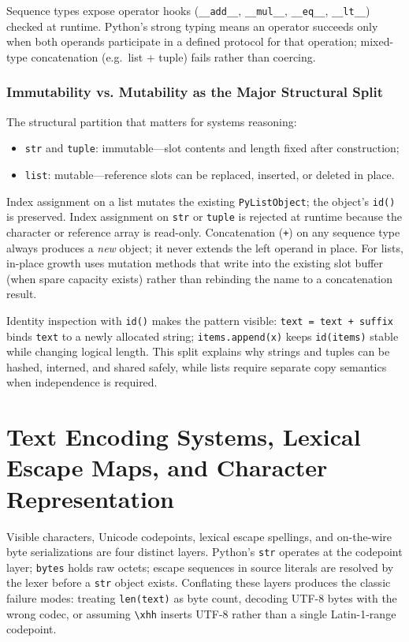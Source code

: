 \documentclass[a4paper,twoside]{report}
\begin{document}
Sequence types expose operator hooks (\texttt{\_\_add\_\_}, \texttt{\_\_mul\_\_}, \texttt{\_\_eq\_\_}, \texttt{\_\_lt\_\_}) checked at runtime. Python's strong typing means an operator succeeds only when both operands participate in a defined protocol for that operation; mixed-type concatenation (e.g.\ list + tuple) fails rather than coercing.

\subsubsection{Immutability vs. Mutability as the Major Structural Split}

The structural partition that matters for systems reasoning:

\begin{itemize}
    \item \texttt{str} and \texttt{tuple}: immutable---slot contents and length fixed after construction;
    \item \texttt{list}: mutable---reference slots can be replaced, inserted, or deleted in place.
\end{itemize}

Index assignment on a list mutates the existing \texttt{PyListObject}; the object's \texttt{id()} is preserved. Index assignment on \texttt{str} or \texttt{tuple} is rejected at runtime because the character or reference array is read-only. Concatenation (\texttt{+}) on any sequence type always produces a \emph{new} object; it never extends the left operand in place. For lists, in-place growth uses mutation methods that write into the existing slot buffer (when spare capacity exists) rather than rebinding the name to a concatenation result.

Identity inspection with \texttt{id()} makes the pattern visible: \texttt{text = text + suffix} binds \texttt{text} to a newly allocated string; \texttt{items.append(x)} keeps \texttt{id(items)} stable while changing logical length. This split explains why strings and tuples can be hashed, interned, and shared safely, while lists require separate copy semantics when independence is required.


\section{Text Encoding Systems, Lexical Escape Maps, and Character Representation}

Visible characters, Unicode codepoints, lexical escape spellings, and on-the-wire byte serializations are four distinct layers. Python's \texttt{str} operates at the codepoint layer; \texttt{bytes} holds raw octets; escape sequences in source literals are resolved by the lexer before a \texttt{str} object exists. Conflating these layers produces the classic failure modes: treating \texttt{len(text)} as byte count, decoding UTF-8 bytes with the wrong codec, or assuming \texttt{\textbackslash xhh} inserts UTF-8 rather than a single Latin-1-range codepoint.
\end{document}
